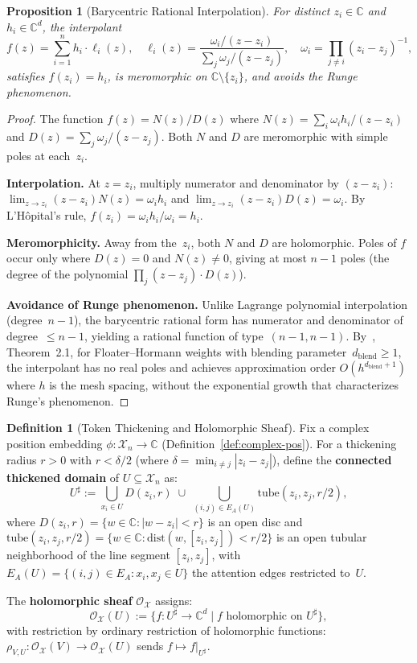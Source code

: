 \documentclass[11pt,a4paper]{article}
\theoremstyle{plain}
\newtheorem{proposition}[theorem]{Proposition}
\theoremstyle{definition}
\newtheorem{definition}[theorem]{Definition}
\theoremstyle{remark}
\newcommand{\C}{\mathbb{C}}
\newcommand{\cO}{\mathcal{O}}
\newcommand{\cX}{\mathcal{X}}
\begin{document}
\begin{proposition}[Barycentric Rational Interpolation]\label{prop:barycentric}
For distinct $z_i \in \C$ and $h_i \in \C^d$, the interpolant
\[
f(z) = \sum_{i=1}^n h_i \cdot \ell_i(z), \quad \ell_i(z) = \frac{\omega_i/(z - z_i)}{\sum_j \omega_j/(z - z_j)}, \quad \omega_i = \prod_{j \neq i}(z_i - z_j)^{-1},
\]
satisfies $f(z_i) = h_i$, is meromorphic on $\C \setminus \{z_i\}$, and avoids the Runge phenomenon.
\end{proposition}

\begin{proof}
The function $f(z) = N(z)/D(z)$ where $N(z) = \sum_i \omega_i h_i/(z - z_i)$ and $D(z) = \sum_j \omega_j/(z - z_j)$. Both $N$ and $D$ are meromorphic with simple poles at each~$z_i$.

\textbf{Interpolation.} At $z = z_i$, multiply numerator and denominator by $(z - z_i)$: $\lim_{z \to z_i} (z - z_i)N(z) = \omega_i h_i$ and $\lim_{z \to z_i}(z-z_i)D(z) = \omega_i$. By L'H\^{o}pital's rule, $f(z_i) = \omega_i h_i / \omega_i = h_i$.

\textbf{Meromorphicity.} Away from the~$z_i$, both $N$ and $D$ are holomorphic. Poles of $f$ occur only where $D(z) = 0$ and $N(z) \neq 0$, giving at most $n-1$ poles (the degree of the polynomial $\prod_j(z - z_j) \cdot D(z)$).

\textbf{Avoidance of Runge phenomenon.} Unlike Lagrange polynomial interpolation (degree~$n-1$), the barycentric rational form has numerator and denominator of degree~$\leq n-1$, yielding a rational function of type~$(n-1, n-1)$. By~\citet{floater2007}, Theorem~2.1, for Floater--Hormann weights with blending parameter~$d_{\mathrm{blend}} \geq 1$, the interpolant has no real poles and achieves approximation order $O(h^{d_{\mathrm{blend}}+1})$ where $h$ is the mesh spacing, without the exponential growth that characterizes Runge's phenomenon.
\end{proof}

\begin{definition}[Token Thickening and Holomorphic Sheaf]\label{def:hol-sheaf}
Fix a complex position embedding $\phi: \cX_n \to \C$ (Definition~\ref{def:complex-pos}). For a thickening radius $r > 0$ with $r < \delta/2$ (where $\delta = \min_{i \neq j}|z_i - z_j|$), define the \textbf{connected thickened domain} of $U \subseteq \cX_n$ as:
\[
U^\sharp := \bigcup_{x_i \in U} D(z_i, r) \;\cup\; \bigcup_{(i,j) \in E_A(U)} \mathrm{tube}(z_i, z_j, r/2),
\]
where $D(z_i, r) = \{w \in \C : |w - z_i| < r\}$ is an open disc and $\mathrm{tube}(z_i, z_j, r/2) = \{w \in \C : \mathrm{dist}(w, [z_i, z_j]) < r/2\}$ is an open tubular neighborhood of the line segment $[z_i, z_j]$, with $E_A(U) = \{(i,j) \in E_A : x_i, x_j \in U\}$ the attention edges restricted to~$U$.

The \textbf{holomorphic sheaf} $\cO_\cX$ assigns:
\[
\cO_\cX(U) := \{f : U^\sharp \to \C^d \mid f \text{ holomorphic on } U^\sharp\},
\]
with restriction by ordinary restriction of holomorphic functions: $\rho_{V,U}: \cO_\cX(V) \to \cO_\cX(U)$ sends $f \mapsto f|_{U^\sharp}$.
\end{definition}
\end{document}

